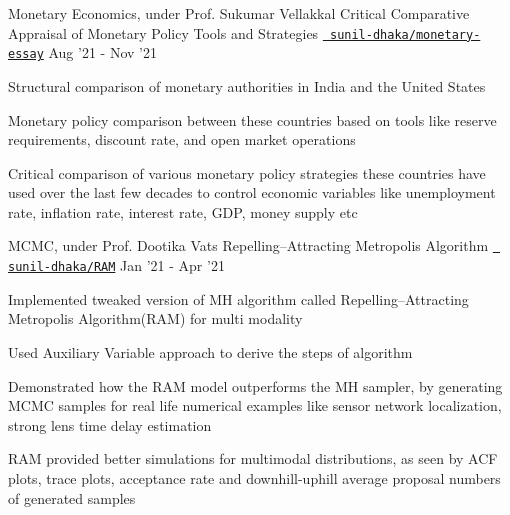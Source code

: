 \begin{cventries}
  \cventry
  {Monetary Economics, under Prof. Sukumar Vellakkal}
  {Critical Comparative Appraisal of Monetary Policy Tools and Strategies}
  {\texttt{\href{https://github.com/sunil-dhaka/monetary-econ-essay}{\faGithub{} sunil-dhaka/monetary-essay}}}
  {Aug '21 - Nov '21}
  {
    \begin{cvitems}
      \item Structural comparison of monetary authorities in India and the United States
      \item Monetary policy comparison between these countries based on tools like reserve requirements, discount rate, and open market operations
      \item Critical comparison of various monetary policy strategies these countries have used over the last few decades to control economic variables like unemployment rate, inflation rate, interest rate, GDP, money supply etc
    \end{cvitems}
  }

  \cventry
  {MCMC, under Prof. Dootika Vats}
  {Repelling–Attracting Metropolis Algorithm}
  {\texttt{\href{https://github.com/sunil-dhaka/RAM}{\faGithub{} sunil-dhaka/RAM}}}
  {Jan '21 - Apr '21}
  {
    \begin{cvitems}
    \item Implemented tweaked version of MH algorithm called Repelling–Attracting Metropolis Algorithm(RAM) for multi modality
    \item Used Auxiliary Variable approach to derive the steps of algorithm
    \item Demonstrated how the RAM model outperforms the MH sampler, by generating MCMC samples for real life numerical examples like sensor network localization, strong lens time delay estimation
    \item RAM provided better simulations for multimodal distributions, as seen by ACF plots, trace plots, acceptance rate and downhill-uphill average proposal numbers of generated samples
    \end{cvitems}
  }


\end{cventries}
